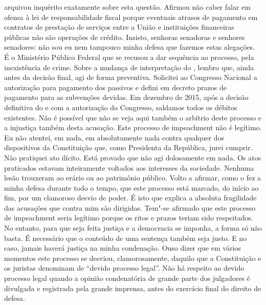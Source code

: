arquivou inquérito exatamente sobre esta questão. Afirmou não caber
falar em ofensa à lei de responsabilidade fiscal porque eventuais
atrasos de pagamento em contratos de prestação de serviços entre a União
e instituições financeiras públicas não são operações de crédito.
Insisto, senhoras senadoras e senhores senadores: não sou eu nem
tampouco minha defesa que fazemos estas alegações. É o Ministério
Público Federal que se recusou a dar sequência ao processo, pela
inexistência de crime. Sobre a mudança de interpretação do , lembro
que, ainda antes da decisão final, agi de forma preventiva. Solicitei ao
Congresso Nacional a autorização para pagamento dos passivos e defini em
decreto prazos de pagamento para as subvenções devidas. Em dezembro de
2015, após a decisão definitiva do  e com a autorização do Congresso,
saldamos todos os débitos existentes. Não é possível que não se veja
aqui também o arbítrio deste processo e a injustiça também desta
acusação. Este processo de impeachment não é legítimo. Eu não atentei,
em nada, em absolutamente nada contra qualquer dos dispositivos da
Constituição que, como Presidenta da República, jurei cumprir. Não
pratiquei ato ilícito. Está provado que não agi dolosamente em nada. Os
atos praticados estavam inteiramente voltados aos interesses da
sociedade. Nenhuma lesão trouxeram ao erário ou ao patrimônio público.
Volto a afirmar, como o fez a minha defesa durante todo o tempo, que
este processo está marcado, do início ao fim, por um clamoroso desvio de
poder. É isto que explica a absoluta fragilidade das acusações que
contra mim são dirigidas. Tem"-se afirmado que este processo de
impeachment seria legítimo porque os ritos e prazos teriam sido
respeitados. No entanto, para que seja feita justiça e a democracia se
imponha, a forma só não basta. É necessário que o conteúdo de uma
sentença também seja justo. E no caso, jamais haverá justiça na minha
condenação. Ouso dizer que em vários momentos este processo se desviou,
clamorosamente, daquilo que a Constituição e os juristas denominam de
``devido processo legal''. Não há respeito ao devido processo legal
quando a opinião condenatória de grande parte dos julgadores é divulgada
e registrada pela grande imprensa, antes do exercício final do direito
de defesa.

